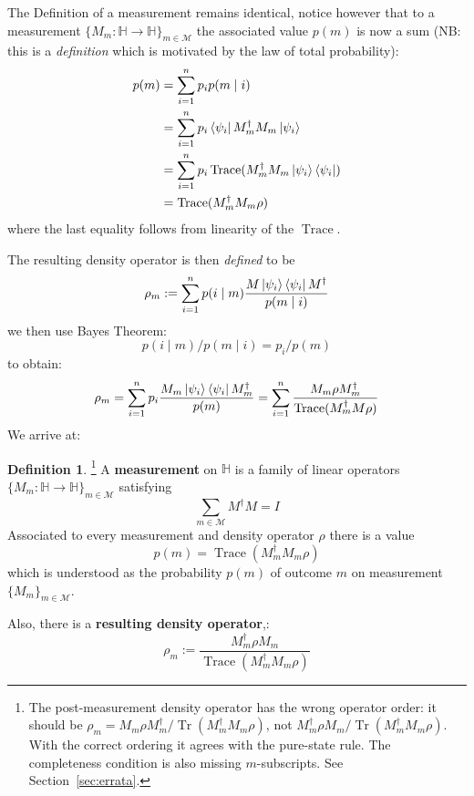 \documentclass[12pt]{article}
\theoremstyle{plain}
\theoremstyle{definition}
\newtheorem{defn}[thm]{Definition} %
\newcommand{\bb}[1]{\mathbb{#1}}
\newcommand{\call}[1]{\mathcal{#1}}
\newcommand{\lto}{\longrightarrow}
\begin{document}
The Definition of a measurement remains identical, notice however that to a measurement $\lbrace M_m: \bb{H} \lto \bb{H}\rbrace_{m \in \call{M}}$ the associated value $p(m)$ is now a sum (NB: this is a \emph{definition} which is motivated by the law of total probability):
\begin{align*}
p(m) &= \sum_{i = 1}^n p_i p(m \mid i)\\
&=\sum_{i = 1}^n p_i \bra{\psi_i}M^\dagger_m M_m \ket{\psi_i}\\
&= \sum_{i = 1}^n p_i \operatorname{Trace}(M^\dagger_m M_m \ket{\psi_i}\bra{\psi_i})\\
&= \operatorname{Trace}(M^\dagger_m M_m \rho)
\end{align*}
where the last equality follows from linearity of the $\operatorname{Trace}$.

The resulting density operator is then \emph{defined} to be
\begin{equation}
\rho_m := \sum_{i = 1}^n p(i\mid m)\frac{M\ket{\psi_i}\bra{\psi_i}M^\dagger}{p(m \mid i)}
\end{equation}
we then use Bayes Theorem:
\begin{equation}
p(i \mid m)/p(m \mid i) = p_i/p(m)
\end{equation}
to obtain:
\begin{equation}
\rho_m = \sum_{i = 1}^n p_i\frac{M_m\ket{\psi_i}\bra{\psi_i}M_m^\dagger}{p(m)} = \sum_{i = 1}^n \frac{M_m\rho M_m^\dagger}{\operatorname{Trace}(M^\dagger_m M \rho)}
\end{equation}
We arrive at:
\begin{defn}\label{def:density_measurement}\footnote{The post-measurement density operator has the wrong operator order: it should be $\rho_m=M_m\rho M_m^\dagger/\operatorname{Tr}(M_m^\dagger M_m\rho)$, not $M_m^\dagger\rho M_m/\operatorname{Tr}(M_m^\dagger M_m\rho)$. With the correct ordering it agrees with the pure-state rule. The completeness condition is also missing $m$-subscripts. See Section~\ref{sec:errata}.}
A \textbf{measurement} on $\bb{H}$ is a family of linear operators $\lbrace M_m: \bb{H} \lto \bb{H}\rbrace_{m \in \call{M}}$ satisfying
\begin{equation}
\sum_{m \in \call{M}}M^\dagger M = I
\end{equation}
Associated to every measurement and density operator $\rho$ there is a value
\begin{equation}
p(m) = \operatorname{Trace}(M^\dagger_mM_m \rho)
\end{equation}
which is understood as the probability $p(m)$ of outcome $m$ on measurement $\lbrace M_m\rbrace_{m \in \call{M}}$.

Also, there is a \textbf{resulting density operator},:
\begin{equation}
\rho_m := \frac{M_m^\dagger \rho M_m}{\operatorname{Trace}(M^\dagger_mM_m \rho)}
\end{equation}
\end{defn}
\end{document}
